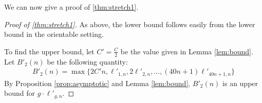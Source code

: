 We can now give a proof of \autoref{thm:stretch1}.

\begin{proof}[Proof of \autoref{thm:stretch1}]
As above, the lower bound follows easily from the lower bound in the orientable setting.  %
  
  To find the upper bound, let $C'=\frac{C}{2}$ be the value given in Lemma \ref{lem:bound}. Let $B'_2(n)$ be the
  following quantity:
  \begin{align*}
    B'_2(n) = \max\{2C'n, \ell'_{1,n}, 2\ell'_{2,n}, \dots, (40n + 1)\ell'_{40n+1,n}\}
  \end{align*}
  By Proposition \ref{prop:asymptotic} and Lemma \ref{lem:bound}, $B'_2(n)$ is an upper bound for $g\cdot \ell'_{g,n}$.
\end{proof}